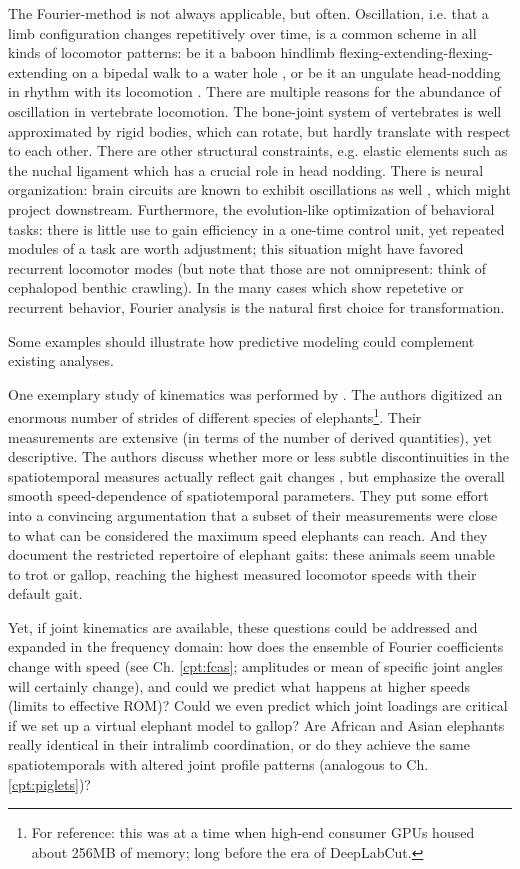 The Fourier-method is not always applicable, but often.
Oscillation, i.e. that a limb configuration changes repetitively over time, is a common scheme in all kinds of locomotor patterns: be it a baboon hindlimb flexing-extending-flexing-extending on a bipedal walk to a water hole \citep{Druelle2021}, or be it an ungulate head-nodding in rhythm with its locomotion \citep{Loscher2016}.
There are multiple reasons for the abundance of oscillation in vertebrate locomotion.
The bone-joint system of vertebrates is well approximated by rigid bodies, which can rotate, but hardly translate with respect to each other.
There are other structural constraints, e.g. elastic elements such as the nuchal ligament which has a crucial role in head nodding.
There is neural organization: brain circuits are known to exhibit oscillations as well \citep{Gupta2016}, which might project downstream.
Furthermore, the evolution-like optimization of behavioral tasks: there is little use to gain efficiency in a one-time control unit, yet repeated modules of a task are worth adjustment; this situation might have favored recurrent locomotor modes (but note that those are not omnipresent: think of cephalopod benthic crawling).
In the many cases which show repetetive or recurrent behavior, Fourier analysis is the natural first choice for transformation.


\bigskip
Some examples should illustrate how predictive modeling could complement existing analyses.

One exemplary study of kinematics was performed by \citet{Hutchinson2006}.
The authors digitized an enormous number of strides of different species of elephants\footnote{For reference: this was at a time when high-end consumer GPUs housed about 256MB of memory; long before the era of DeepLabCut.}.
Their measurements are extensive (in terms of the number of derived quantities), yet descriptive.
The authors discuss whether more or less subtle discontinuities in the spatiotemporal measures actually reflect gait changes \citep{Alexander1989}, but emphasize the overall smooth speed-dependence of spatiotemporal parameters.
They put some effort into a convincing argumentation that a subset of their measurements were close to what can be considered the maximum speed elephants can reach.
And they document the restricted repertoire of elephant gaits: these animals seem unable to trot or gallop, reaching the highest measured locomotor speeds with their default gait.

Yet, if joint kinematics are available, these questions could be addressed and expanded in the frequency domain: how does the ensemble of Fourier coefficients change with speed (see Ch. \ref{cpt:fcas}; amplitudes or mean of specific joint angles will certainly change), and could we predict what happens at higher speeds (limits to effective ROM)?
Could we even predict which joint loadings are critical if we set up a virtual elephant model to gallop?
Are African and Asian elephants really identical in their intralimb coordination, or do they achieve the same spatiotemporals with altered joint profile patterns (analogous to Ch. \ref{cpt:piglets})?


